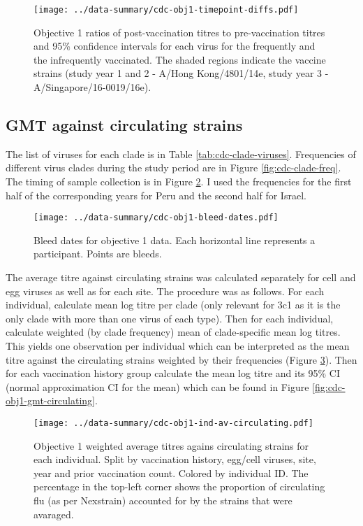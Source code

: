\documentclass[12pt]{article}
\begin{document}
\begin{figure}
	\texttt{[image: ../data-summary/cdc-obj1-timepoint-diffs.pdf]}
	\caption{Objective 1 ratios of post-vaccination titres to pre-vaccination titres and 95\% confidence intervals for each virus for the frequently and the infrequently vaccinated. The shaded regions indicate the vaccine strains (study year 1 and 2 - A/Hong Kong/4801/14e, study year 3 - A/Singapore/16-0019/16e).}
	\label{fig:cdc-obj1-timepoint-diffs}
\end{figure}

\subsection{GMT against circulating strains}

The list of viruses for each clade is in Table \ref{tab:cdc-clade-viruses}. Frequencies of different virus clades during the study period are in Figure \ref{fig:cdc-clade-freq}. The timing of sample collection is in Figure \ref{fig:cdc-obj1-bleed-dates}. I used the frequencies for the first half of the corresponding years for Peru and the second half for Israel.

\begin{figure}
	\texttt{[image: ../data-summary/cdc-obj1-bleed-dates.pdf]}
	\caption{Bleed dates for objective 1 data. Each horizontal line represents a participant. Points are bleeds.}
	\label{fig:cdc-obj1-bleed-dates}
\end{figure}

The average titre against circulating strains was calculated separately for cell and egg viruses as well as for each site. The procedure was as follows. For each individual, calculate mean log titre per clade (only relevant for 3c1 as it is the only clade with more than one virus of each type). Then for each individual, calculate weighted (by clade frequency) mean of clade-specific mean log titres. This yields one observation per individual which can be interpreted as the mean titre against the circulating strains weighted by their frequencies (Figure \ref{fig:cdc-obj1-ind-av-circulating}). Then for each vaccination history group calculate the mean log titre and its 95\% CI (normal approximation CI for the mean) which can be found in Figure \ref{fig:cdc-obj1-gmt-circulating}.

\begin{figure}
	\texttt{[image: ../data-summary/cdc-obj1-ind-av-circulating.pdf]}
	\caption{Objective 1 weighted average titres agains circulating strains for each individual. Split by vaccination history, egg/cell viruses, site, year and prior vaccination count. Colored by individual ID.  The percentage in the top-left corner shows the proportion of circulating flu (as per Nexstrain) accounted for by the strains that were avaraged.}
	\label{fig:cdc-obj1-ind-av-circulating}
\end{figure}
\end{document}
